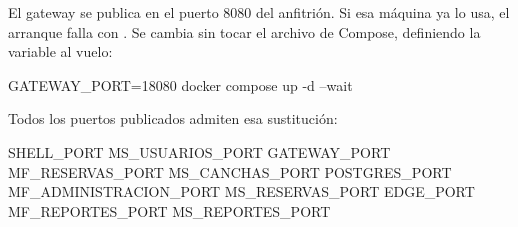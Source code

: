 El gateway se publica en el puerto 8080 del anfitrión. Si esa máquina ya lo
usa, el arranque falla con . Se cambia sin tocar
el archivo de Compose, definiendo la variable al vuelo:

\begin{comando}
GATEWAY_PORT=18080 docker compose up -d --wait
\end{comando}

Todos los puertos publicados admiten esa sustitución:

\begin{comando}
SHELL_PORT              MS_USUARIOS_PORT        GATEWAY_PORT
MF_RESERVAS_PORT        MS_CANCHAS_PORT         POSTGRES_PORT
MF_ADMINISTRACION_PORT  MS_RESERVAS_PORT        EDGE_PORT
MF_REPORTES_PORT        MS_REPORTES_PORT
\end{comando}

